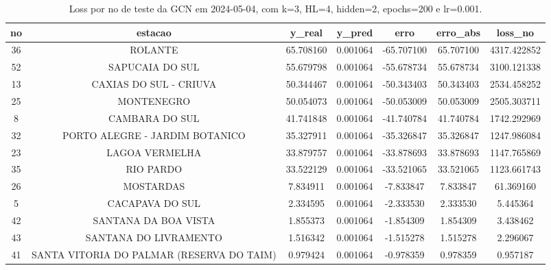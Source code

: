 \begin{table}[h]
\centering
\caption{Loss por no de teste da GCN em 2024-05-04, com k=3, HL=4, hidden=2, epochs=200 e lr=0.001.}
\label{tab:gcn_loss_k3_hl4_h2_e200_d20240504}
\begin{tabular}{ccccccc}
\toprule
no & estacao & y\_real & y\_pred & erro & erro\_abs & loss\_no \\
\midrule
36 & ROLANTE & 65.708160 & 0.001064 & -65.707100 & 65.707100 & 4317.422852 \\
52 & SAPUCAIA DO SUL & 55.679798 & 0.001064 & -55.678734 & 55.678734 & 3100.121338 \\
13 & CAXIAS DO SUL - CRIUVA & 50.344467 & 0.001064 & -50.343403 & 50.343403 & 2534.458252 \\
25 & MONTENEGRO & 50.054073 & 0.001064 & -50.053009 & 50.053009 & 2505.303711 \\
8 & CAMBARA DO SUL & 41.741848 & 0.001064 & -41.740784 & 41.740784 & 1742.292969 \\
32 & PORTO ALEGRE - JARDIM BOTANICO & 35.327911 & 0.001064 & -35.326847 & 35.326847 & 1247.986084 \\
23 & LAGOA VERMELHA & 33.879757 & 0.001064 & -33.878693 & 33.878693 & 1147.765869 \\
35 & RIO PARDO & 33.522129 & 0.001064 & -33.521065 & 33.521065 & 1123.661743 \\
26 & MOSTARDAS & 7.834911 & 0.001064 & -7.833847 & 7.833847 & 61.369160 \\
5 & CACAPAVA DO SUL & 2.334595 & 0.001064 & -2.333530 & 2.333530 & 5.445364 \\
42 & SANTANA DA BOA VISTA & 1.855373 & 0.001064 & -1.854309 & 1.854309 & 3.438462 \\
43 & SANTANA DO LIVRAMENTO & 1.516342 & 0.001064 & -1.515278 & 1.515278 & 2.296067 \\
41 & SANTA VITORIA DO PALMAR (RESERVA DO TAIM) & 0.979424 & 0.001064 & -0.978359 & 0.978359 & 0.957187 \\
\bottomrule
\end{tabular}
\end{table}
